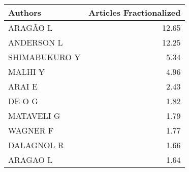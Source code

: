 
\begin{tabular}{lr}
\toprule
Authors & Articles Fractionalized\\
\midrule
ARAGÃO L & 12.65\\
ANDERSON L & 12.25\\
SHIMABUKURO Y & 5.34\\
MALHI Y & 4.96\\
ARAI E & 2.43\\
\addlinespace
DE O G & 1.82\\
MATAVELI G & 1.79\\
WAGNER F & 1.77\\
DALAGNOL R & 1.66\\
ARAGAO L & 1.64\\
\bottomrule
\end{tabular}